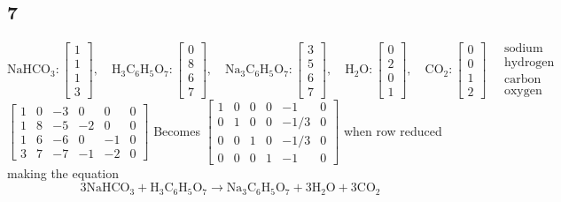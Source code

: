 \documentclass{article}
\begin{document}
\subsection*{7}
$ \text{NaHCO}_3 :
\begin{bmatrix} 1 \\ 1 \\ 1 \\ 3 \end{bmatrix}, \quad
\text{H}_3\text{C}_6\text{H}_5\text{O}_7 :
\begin{bmatrix} 0 \\ 8 \\ 6 \\ 7 \end{bmatrix}, \quad
\text{Na}_3\text{C}_6\text{H}_5\text{O}_7 :
\begin{bmatrix} 3 \\ 5 \\ 6 \\ 7 \end{bmatrix}, \quad
\text{H}_2\text{O} :
\begin{bmatrix} 0 \\ 2 \\ 0 \\ 1 \end{bmatrix}, \quad
\text{CO}_2 :
\begin{bmatrix} 0 \\ 0 \\ 1 \\ 2 \end{bmatrix} \quad
\begin{array}{l}
\text{sodium} \\ \text{hydrogen} \\ \text{carbon} \\ \text{oxygen}
\end{array} $\\[0.1in]
$ 
\begin{bmatrix}
1 & 0 & -3 & 0 & 0 & 0 \\
1 & 8 & -5 & -2 & 0 & 0 \\
1 & 6 & -6 & 0 & -1 & 0 \\
3 & 7 & -7 & -1 & -2 & 0
\end{bmatrix}
$ Becomes $
\begin{bmatrix}
1 & 0 & 0 & 0 & -1 & 0 \\
0 & 1 & 0 & 0 & -1/3 & 0 \\
0 & 0 & 1 & 0 & -1/3 & 0 \\
0 & 0 & 0 & 1 & -1 & 0
\end{bmatrix}
$ when row reduced making the equation $$ 3\text{NaHCO}_3 + \text{H}_3\text{C}_6\text{H}_5\text{O}_7 \rightarrow \text{Na}_3\text{C}_6\text{H}_5\text{O}_7 + 3\text{H}_2\text{O} + 3\text{CO}_2 $$
\end{document}
